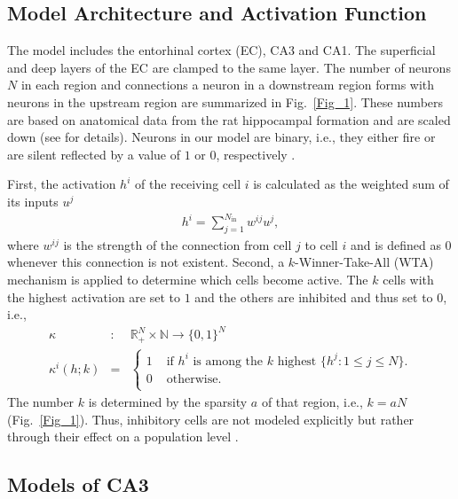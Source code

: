 \documentclass[utf8]{frontiersSCNS} %
\begin{document}
\subsection*{Model Architecture and Activation Function}


The model includes the entorhinal cortex (EC), CA3 and CA1. The superficial and deep layers of the EC are clamped to the same layer. The number of neurons $N$ in each region and connections a neuron in a downstream region forms with neurons in the upstream region are summarized in Fig.~\ref{Fig_1}. These numbers are based on anatomical data from the rat hippocampal formation \cite{amaral1990chapter, cutsuridis2010hippocampal} and are scaled down (see \cite{neher2015memory} for details). Neurons in our model are binary, i.e., they either fire or are silent reflected by a value of $1$ or $0$, respectively \cite{fontanari1995model}.


First, the activation $h^i$ of the receiving cell $i$ is calculated as the weighted sum of its inputs $u^j$
\begin{align}
	\label{activation}
	h^i = \sum_{j=1}^{N_\mathrm{in}} w^{ij}u^j,
\end{align}  
where $w^{ij}$ is the strength of the connection from cell $j$ to cell $i$ and is defined as $0$ whenever this connection is not existent. Second, a $k$-Winner-Take-All (WTA) mechanism is applied to determine which cells become active. The $k$ cells with the highest activation are set to $1$ and the others are inhibited and thus set to $0$, i.e.,
\begin{eqnarray}
\label{eq:kWTA}
	\kappa &:& \mathbb{R}_+^N \times \mathbb{N} \to \{0,1\}^N \\
	\kappa^i (h;k) &=& \left \{ \begin{array}{ll}
			1 &\text{ if $h^i$ is among the $k$ highest } \{ h^j:1\le j\le N \}. \\
			0 &\text{ otherwise}.\\
	\end{array} \right.
	\label{eq:binary}
\end{eqnarray}
The number $k$ is determined by the sparsity $a$ of that region, i.e., $k = aN$ (Fig.~\ref{Fig_1}). 
Thus, inhibitory cells are not modeled explicitly but rather through their effect on a population level \cite{renno2010mechanism, roudi2008representing, moustafa2009neurocomputational, appleby2011role, monaco2011modular}.


\subsection{Models of CA3}
\label{ca3:models}
\end{document}
